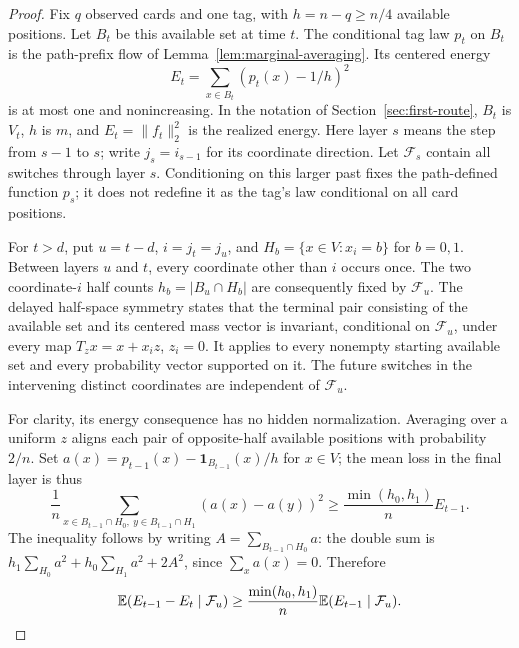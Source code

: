 \begin{proof}
Fix $q$ observed cards and one tag, with $h=n-q\ge n/4$ available
positions. Let $B_t$ be this available set at time $t$. The conditional
tag law $p_t$ on $B_t$ is the path-prefix
flow of Lemma~\ref{lem:marginal-averaging}. Its centered energy
\[
 E_t=\sum_{x\in B_t}(p_t(x)-1/h)^2
\]
is at most one and nonincreasing. In the notation of
Section~\ref{sec:first-route}, $B_t$ is $V_t$, $h$ is $m$, and
$E_t=\|f_t\|_2^2$ is the realized energy. Here layer $s$ means the step from
$s-1$ to $s$; write $j_s=i_{s-1}$ for its coordinate direction.
Let $\mathcal F_s$ contain all switches through layer $s$. Conditioning on this larger past fixes
the path-defined function $p_s$; it does not redefine it as the
tag's law conditional on all card positions.

For $t>d$, put $u=t-d$, $i=j_t=j_u$, and
$H_b=\{x\in V:x_i=b\}$ for $b=0,1$. Between layers $u$
and $t$, every coordinate other than $i$ occurs once. The two
coordinate-$i$ half counts $h_b=|B_u\cap H_b|$ are consequently fixed by
$\mathcal F_u$. The delayed half-space symmetry
\cite[Lemma~\ref*{f-shear:lem:delayed-symmetry}]{coordinateFrames}
states that the terminal pair consisting of the available set and
its centered mass vector is invariant, conditional on
$\mathcal F_u$, under every map $T_zx=x+x_i z$, $z_i=0$.
It applies to every nonempty starting available set and every probability
vector supported on it. The future switches in the intervening distinct coordinates are independent of
$\mathcal F_u$.

For clarity, its energy consequence has no hidden normalization.
Averaging over a uniform $z$ aligns each pair of opposite-half
available positions with probability $2/n$. Set
$a(x)=p_{t-1}(x)-\mathbf1_{B_{t-1}}(x)/h$ for $x\in V$;
the mean loss in the final layer is thus
\[
 \frac1n\sum_{x\in B_{t-1}\cap H_0,\ y\in B_{t-1}\cap H_1}
       (a(x)-a(y))^2
 \ge\frac{\min(h_0,h_1)}n E_{t-1}.
\]
The inequality follows by writing $A=\sum_{B_{t-1}\cap H_0}a$:
the double sum is
$h_1\sum_{H_0}a^2+h_0\sum_{H_1}a^2+2A^2$, since
$\sum_xa(x)=0$. Therefore
\begin{equation}\label{lifts:conditional-shear-loss}
 \mathbb E(E_{t-1}-E_t\mid\mathcal F_u)
 \ge\frac{\min(h_0,h_1)}n\mathbb E(E_{t-1}\mid\mathcal F_u).
\end{equation}


\end{proof}
